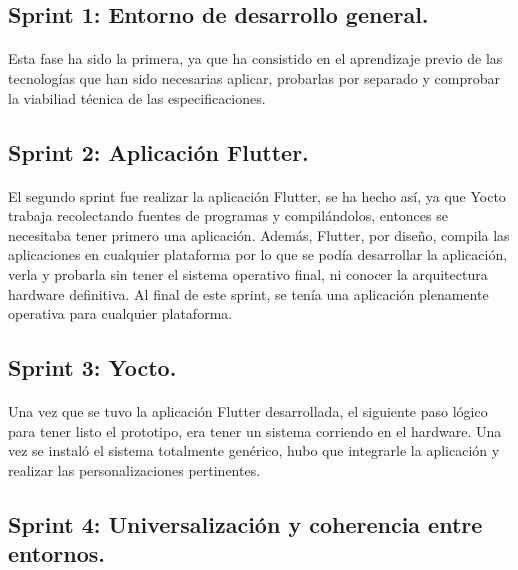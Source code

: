 \subsection{Sprint 1: Entorno de desarrollo general.}

\paragraph{}Esta fase ha sido la primera, ya que ha consistido en el aprendizaje previo
de las tecnologías que han sido necesarias aplicar, probarlas por separado y comprobar
la viabiliad técnica de las especificaciones.

\subsection{Sprint 2: Aplicación Flutter.}

\paragraph{}El segundo sprint fue realizar la aplicación Flutter, se ha hecho así, ya
que Yocto trabaja recolectando fuentes de programas y compilándolos, entonces se
necesitaba tener primero una aplicación. Además, Flutter, por
diseño, compila las aplicaciones en cualquier plataforma por lo que se podía desarrollar
la aplicación, verla y probarla sin tener el sistema operativo final, ni conocer la
arquitectura hardware definitiva. Al final de este sprint, se tenía una aplicación plenamente
operativa para cualquier plataforma.

\subsection{Sprint 3: Yocto.}

\paragraph{}Una vez que se tuvo la aplicación Flutter desarrollada, el siguiente paso
lógico para tener listo el prototipo, era tener un sistema corriendo en el hardware.
Una vez se instaló el sistema totalmente genérico, hubo que integrarle la aplicación y realizar
las personalizaciones pertinentes.

\subsection{Sprint 4: Universalización y coherencia entre entornos.}

